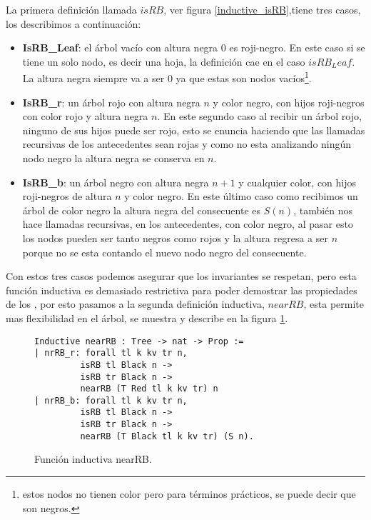 La primera definici\'on llamada $isRB$, ver figura \ref{inductive_isRB},tiene tres casos, los
describimos a continuaci\'on:
\begin{itemize}
        \item \textbf{IsRB\_Leaf}: el árbol vacío con altura negra 0 es roji-negro. En este caso
        si se tiene un solo nodo, es decir una hoja, la definici\'on cae en el caso $isRB_Leaf$.
        La altura negra siempre va a ser 0 ya que estas son nodos vacíos\footnote{estos nodos no
        tienen color pero para términos prácticos, se puede decir que son negros.}.
        \item \textbf{IsRB\_r}: un árbol rojo con altura negra $n$ y color negro, con hijos
        roji-negros con color rojo y altura negra $n$. En este segundo caso al recibir un \'arbol
        rojo, ninguno de sus hijos puede ser rojo, esto se enuncia haciendo que las llamadas
        recursivas de los antecedentes sean rojas y como no esta analizando ningún nodo negro la
        altura negra se conserva en $n$.
        \item \textbf{IsRB\_b}: un árbol negro con altura negra $n+1$ y cualquier color, con hijos
        roji-negros de altura $n$ y color negro. En este \'ultimo caso como recibimos un \'arbol
        de color negro la altura negra del consecuente es $S(n)$, también nos hace llamadas
        recursivas, en los antecedentes, con color negro, al pasar esto los nodos pueden ser tanto
        negros como rojos y la altura regresa a ser $n$ porque no se esta contando el nuevo nodo
        negro del consecuente.
\end{itemize}

Con estos tres casos podemos asegurar que los invariantes se respetan, pero esta funci\'on
inductiva es demasiado restrictiva para poder demostrar las propiedades de los {\arns}, por esto
pasamos a la segunda definici\'on inductiva, $nearRB$,  esta permite mas flexibilidad en el
\'arbol, se muestra y describe en la figura \ref{inductive_nearRB}.

\begin{figure}
\centering
\captionsetup{justification=centering}
\begin{verbatim}
Inductive nearRB : Tree -> nat -> Prop :=
| nrRB_r: forall tl k kv tr n,
         isRB tl Black n ->
         isRB tr Black n ->
         nearRB (T Red tl k kv tr) n
| nrRB_b: forall tl k kv tr n,
         isRB tl Black n ->
         isRB tr Black n ->
         nearRB (T Black tl k kv tr) (S n).
\end{verbatim}
\caption{Funci\'on inductiva nearRB.}
\label{inductive_nearRB}
\end{figure}

